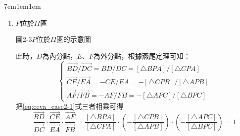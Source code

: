 \documentclass[12pt]{article}
\begin{document}
\begin{mybox}[必要性證明]{7em}{1em}{1em}
\begin{enumerate}[label=Case \arabic*：, itemsep=2em]
        \item $P$位於$II$區
        \begin{center}
            \vspace{0.5cm}
            \noindent
            \begin{minipage}{\textwidth}
            \centering
            圖2-3\quad $P$位於$II$區的示意圖
            \end{minipage}%
        \end{center}
        此時，$D$為內分點，$E$、$F$為外分點，根據燕尾定理可知：
        \begin{equation}
            \begin{cases}
                \overrightarrow{BD}/\overrightarrow{DC}=BD/DC=\left[\triangle{BPA}\right]/\left[\triangle{CPA}\right]\\
                \overrightarrow{CE}/\overrightarrow{EA}=-CE/EA=-\left[\triangle{CPB}\right]/\left[\triangle{APB}\right]\\
                \overrightarrow{AF}/\overrightarrow{FB}=-AF/FB=-\left[\triangle{APC}\right]/\left[\triangle{BPC}\right]
            \end{cases}\label{eq:ceva_case2-1}
        \end{equation}
        把\eqref{eq:ceva_case2-1}式三者相乘可得
        \begin{equation}
            \frac{\overrightarrow{BD}}{\overrightarrow{DC}}
            \cdot\frac{\overrightarrow{CE}}{\overrightarrow{EA}}
            \cdot\frac{\overrightarrow{AF}}{\overrightarrow{FB}}
            =\frac{\left[\triangle{BPA}\right]}{\left[\triangle{CPA}\right]}
            \cdot\left(-\frac{\left[\triangle{CPB}\right]}{\left[\triangle{APB}\right]}\right)
            \cdot\left(-\frac{\left[\triangle{APC}\right]}{\left[\triangle{BPC}\right]}\right)
            =1\label{eq:ceva_case2-2}
        \end{equation}


\end{enumerate}
\end{mybox}
\end{document}
